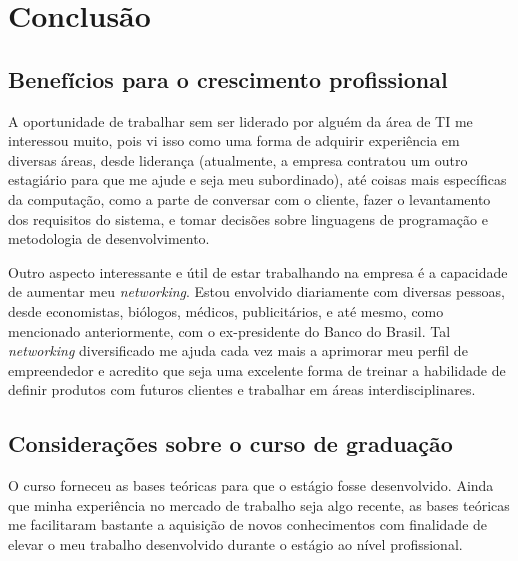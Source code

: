 \chapter{Conclusão}
\label{chap:conclusao}

\section{Benefícios para o crescimento profissional}

A oportunidade de trabalhar sem ser liderado por alguém da área de TI me interessou muito, pois vi isso como uma 
forma de adquirir experiência em diversas áreas, desde liderança (atualmente, a empresa contratou um outro estagiário para que me
ajude e seja meu subordinado), até coisas mais específicas da computação, como a parte de conversar com o cliente,
fazer o levantamento dos requisitos do sistema, e tomar decisões sobre linguagens de programação e metodologia de desenvolvimento.

Outro aspecto interessante e útil de estar trabalhando na empresa é a capacidade de aumentar meu \textit{networking}.
Estou envolvido diariamente com diversas pessoas, desde economistas, biólogos, médicos, publicitários, e até mesmo, como mencionado
anteriormente, com o ex-presidente do Banco do Brasil. Tal \textit{networking} diversificado me ajuda cada vez mais a aprimorar 
meu perfil de empreendedor e acredito que seja uma excelente forma de treinar a habilidade de definir produtos com futuros clientes
e trabalhar em áreas interdisciplinares.




\section{Considerações sobre o curso de graduação}

O curso forneceu as bases teóricas para que o estágio fosse desenvolvido. Ainda que minha experiência no mercado de trabalho seja algo recente, 
as bases teóricas me facilitaram bastante a aquisição de novos conhecimentos com finalidade de elevar o meu trabalho desenvolvido 
durante o estágio ao nível profissional.



